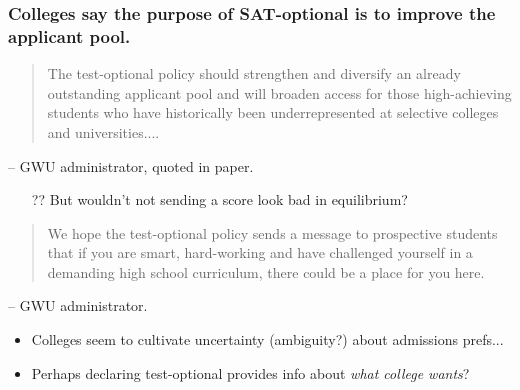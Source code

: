 \documentclass[11pt, aspectratio=169]{beamer}
\theoremstyle{plain}
\theoremstyle{plain}
\theoremstyle{plain}
\theoremstyle{plain}
\begin{document}
\begin{frame}\frametitle{Colleges say the purpose of SAT-optional is to improve the applicant pool.}
    \begin{quotation} The test-optional policy should strengthen and diversify an already outstanding applicant pool and will broaden access for those high-achieving students who have historically been underrepresented at selective colleges and universities....
        \end{quotation} -- GWU administrator, quoted in paper.  \pause

        \begin{itemize}
            \item[??] But wouldn't not sending a score look bad in equilibrium? \pause
        \end{itemize} 

        \begin{quotation}
            We hope the test-optional policy sends a message to prospective students that if you are smart, hard-working and have challenged yourself in a demanding high school curriculum, there could be a place for you here.
        \end{quotation} -- GWU administrator.  \\ \pause
        
        \begin{itemize}
            \item Colleges seem to cultivate uncertainty (ambiguity?) about admissions prefs... \pause
            \item Perhaps declaring test-optional provides info about \emph{what college wants}?
        \end{itemize}
    \end{frame}
\end{document}
